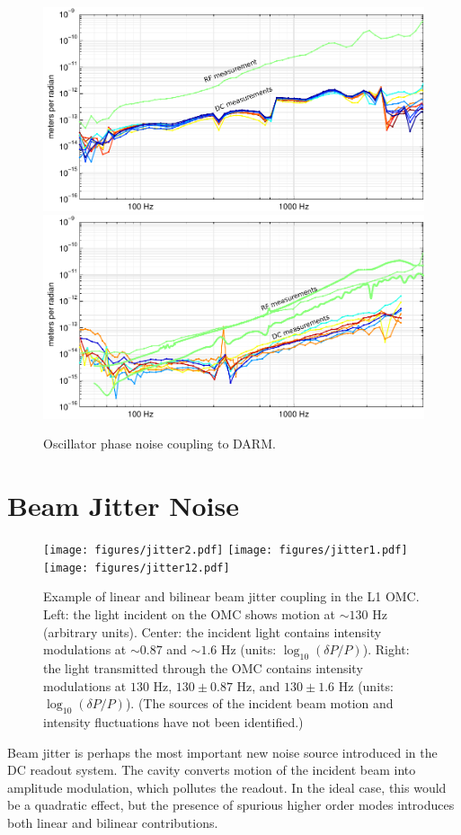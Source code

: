 \begin{figure} %
\includegraphics[]{figures/oscPM-L1.pdf}
\includegraphics[]{figures/oscPM-H1.pdf}
\caption[Oscillator phase noise coupling (measured)]{\label{fig:osc-PM}Oscillator phase noise coupling to DARM.}
\end{figure}

\section{Beam Jitter Noise}



\begin{figure}[t]
\texttt{[image: figures/jitter2.pdf]}
\texttt{[image: figures/jitter1.pdf]}
\texttt{[image: figures/jitter12.pdf]}
\caption[Example of linear and bilinear beam jitter
  coupling]{\label{fig:jitter-mechanism}Example of linear and bilinear
  beam jitter coupling in the L1 OMC.  Left: the light incident on the
  OMC shows motion at $\sim 130$ Hz (arbitrary units).  Center: the incident light
  contains intensity modulations at $\sim 0.87$ and $\sim 1.6$
  Hz (units: $\log_{10} (\delta{}P/P)$). Right: the light transmitted through the OMC contains intensity
  modulations at $130$ Hz, $130 \pm 0.87$ Hz, and $ 130 \pm 1.6$ Hz (units: $\log_{10} (\delta{}P/P)$).
  (The sources of the incident beam motion and intensity fluctuations
  have not been identified.)}
\end{figure}
Beam jitter is perhaps the most important new noise source introduced
in the DC readout system.  The cavity converts motion of the incident
beam into amplitude modulation, which pollutes the readout.  In the
ideal case, this would be a quadratic effect, but the presence of
spurious higher order modes introduces both linear and bilinear contributions.

